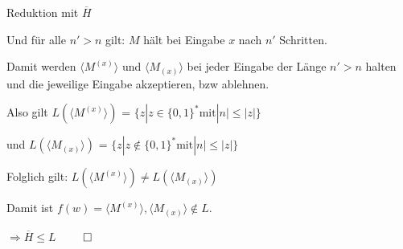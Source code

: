 \documentclass[answers]{submit}
\begin{document}
\begin{exercise}[6]{Reduktion mit $\overline{H}$}
{    Und für alle $n'>n$ gilt: $M$ hält bei Eingabe $x$ nach $n'$ Schritten.

    Damit werden $\langle M^{(x)}\rangle$ und $\langle M_{(x)}\rangle$ bei jeder Eingabe der Länge $n'>n$ halten und die jeweilige Eingabe akzeptieren, bzw ablehnen.

    Also gilt $L(\langle M^{(x)}\rangle)$ = $\{ z | z \in \{0,1\}^* \text{mit} |n| \leq |z| \} $

    und $L(\langle M_{(x)}\rangle)$ = $\{ z | z \notin \{0,1\}^* \text{mit} |n| \leq |z| \} $

    Folglich gilt: $L(\langle M^{(x)}\rangle) \neq L(\langle M_{(x)}\rangle)$

    Damit ist $f(w)=\langle M^{(x)}\rangle,\langle M_{(x)}\rangle \notin L$.

    $\Rightarrow \overline{H} \leq L$ $\qed$
  }
\end{exercise}
\end{document}
